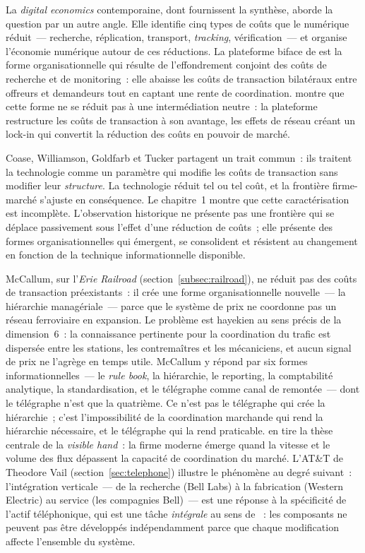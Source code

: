 \markNEO
La \emph{digital economics} contemporaine, dont \textcite{goldfarb_digital_2019} fournissent la synthèse, aborde la question par un autre angle. Elle identifie cinq types de coûts que le numérique réduit~--- recherche, réplication, transport, \emph{tracking}, vérification~--- et organise l'économie numérique autour de ces réductions. La plateforme biface de \textcite{rochet_platform_2003} est la forme organisationnelle qui résulte de l'effondrement conjoint des coûts de recherche et de monitoring~: elle abaisse les coûts de transaction bilatéraux entre offreurs et demandeurs tout en captant une rente de coordination. \textcite{srnicek_platform_2017} montre que cette forme ne se réduit pas à une intermédiation neutre~: la plateforme restructure les coûts de transaction à son avantage, les effets de réseau créant un lock-in qui convertit la réduction des coûts en pouvoir de marché.

Coase, Williamson, Goldfarb et Tucker partagent un trait commun~: ils traitent la technologie comme un paramètre qui modifie les coûts de transaction sans modifier leur \emph{structure}. La technologie réduit tel ou tel coût, et la frontière firme-marché s'ajuste en conséquence. Le chapitre~1 montre que cette caractérisation est incomplète. L'observation historique ne présente pas une frontière qui se déplace passivement sous l'effet d'une réduction de coûts~; elle présente des formes organisationnelles qui émergent, se consolident et résistent au changement en fonction de la technique informationnelle disponible.

McCallum, sur l'\emph{Erie Railroad} (section~\ref{subsec:railroad}), ne réduit pas des coûts de transaction préexistants~: il crée une forme organisationnelle nouvelle~--- la hiérarchie managériale~--- parce que le système de prix ne coordonne pas un réseau ferroviaire en expansion. Le problème est hayekien au sens précis de la dimension~6~: la connaissance pertinente pour la coordination du trafic est dispersée entre les stations, les contremaîtres et les mécaniciens, et aucun signal de prix ne l'agrège en temps utile. McCallum y répond par six formes informationnelles~--- le \emph{rule book}, la hiérarchie, le reporting, la comptabilité analytique, la standardisation, et le télégraphe comme canal de remontée~--- dont le télégraphe n'est que la quatrième. Ce n'est pas le télégraphe qui crée la hiérarchie~; c'est l'impossibilité de la coordination marchande qui rend la hiérarchie nécessaire, et le télégraphe qui la rend praticable. \textcite{chandler_visible_1977} en tire la thèse centrale de la \emph{visible hand}~: la firme moderne émerge quand la vitesse et le volume des flux dépassent la capacité de coordination du marché. L'AT\&T de Theodore Vail (section~\ref{sec:telephone}) illustre le phénomène au degré suivant~: l'intégration verticale~--- de la recherche (Bell Labs) à la fabrication (Western Electric) au service (les compagnies Bell)~--- est une réponse à la spécificité de l'actif téléphonique, qui est une tâche \emph{intégrale} au sens de \textcite{ulrich_role_1995}~: les composants ne peuvent pas être développés indépendamment parce que chaque modification affecte l'ensemble du système.

